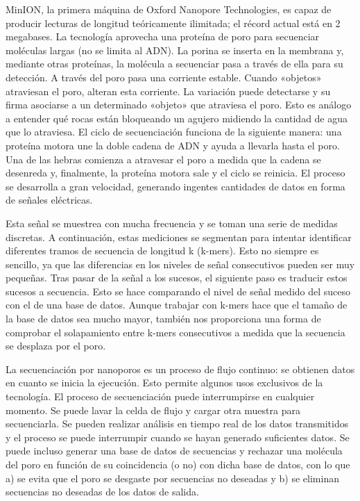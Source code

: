 \begin{itemize}
MinION, la primera máquina de Oxford Nanopore Technologies, es capaz de producir lecturas de longitud teóricamente ilimitada; el récord actual está en 2 megabases. La tecnología aprovecha una proteína de poro para secuenciar moléculas largas (no se limita al ADN). La porina se inserta en la membrana y, mediante otras proteínas, la molécula a secuenciar pasa a través de ella para su detección. A través del poro pasa una corriente estable. Cuando «objetos» atraviesan el poro, alteran esta corriente. La variación puede detectarse y su firma asociarse a un determinado «objeto» que atraviesa el poro.
Esto es análogo a entender qué rocas están bloqueando un agujero midiendo la cantidad de agua que lo atraviesa.
El ciclo de secuenciación funciona de la siguiente manera: una proteína motora une la doble cadena de ADN y ayuda a llevarla hasta el poro. Una de las hebras comienza a atravesar el poro a medida que la cadena se desenreda y, finalmente, la proteína motora sale y el ciclo se reinicia.
El proceso se desarrolla a gran velocidad, generando ingentes cantidades de datos en forma de señales eléctricas.

Esta señal se muestrea con mucha frecuencia y se toman una serie de medidas discretas. A continuación, estas mediciones se segmentan para intentar identificar diferentes tramos de secuencia de longitud k (k-mers). Esto no siempre es sencillo, ya que las diferencias en los niveles de señal consecutivos pueden ser muy pequeñas.
Tras pasar de la señal a los sucesos, el siguiente paso es traducir estos sucesos a secuencia. Esto se hace comparando el nivel de señal medido del suceso con el de una base de datos.
Aunque trabajar con k-mers hace que el tamaño de la base de datos sea mucho mayor, también nos proporciona una forma de comprobar el solapamiento entre k-mers consecutivos a medida que la secuencia se desplaza por el poro.

La secuenciación por nanoporos es un proceso de flujo continuo: se obtienen datos en cuanto se inicia la ejecución. Esto permite algunos usos exclusivos de la tecnología.
El proceso de secuenciación puede interrumpirse en cualquier momento. Se puede lavar la celda de flujo y cargar otra muestra para secuenciarla.
Se pueden realizar análisis en tiempo real de los datos transmitidos y el proceso se puede interrumpir cuando se hayan generado suficientes datos.
Se puede incluso generar una base de datos de secuencias y rechazar una molécula del poro en función de su coincidencia (o no) con dicha base de datos, con lo que a) se evita que el poro se desgaste por secuencias no deseadas y b) se eliminan secuencias no deseadas de los datos de salida.


\end{itemize}
